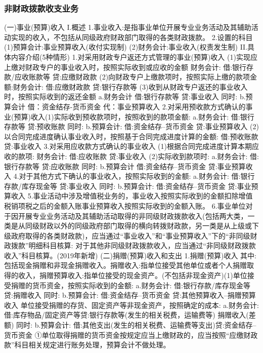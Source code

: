 \documentclass[UTF8,12pt]{ctexart}
\numberwithin{equation}{section} %
\numberwithin{figure}{section}
\numberwithin{table}{section}
\begin{document}
	\subsubsection{非财政拨款收支业务}
	(一)事业(预算)收入
	I.概述
	1.事业收入:是指事业单位开展专业业务活动及其辅助活动实现的收入，不包括从同级政府财政部门取得的各类财政拨款。
	2.设置的科目
	(1)预算会计:事业预算收入(收付实现制)
	(2)财务会计:事业收入(权责发生制)
	II.具体内容介绍(5种情形)
	1.对采用财政专户返还方式管理的事业(预算)收入
	(1)实现应上缴对财政专户的事业收入时，按照实际收到或应收的金额
	财务会计:
	借:银行存款/应收账款等
	贷:应缴财政款
	(2)向财政专户上缴款项时，按照实际上缴的款项金额:财务会计:
	借:应缴财政款
	贷:银行存款等
	(3)收到从财政专户返还的事业收入时，按照实际收到的返还金额
	a.财务会计
	借:银行存款等
	贷:事业收入
	同时:
	b.预算会计
	借：资金结存-货币资金
	代：事业预算收入
	2.对采用预收款方式确认的事业(预算)收入(1)实际收到预收款项时，按照收到的款项金额:
	a.财务会计:
	借:银行存款等
	贷:预收账款
	同时:
	b.预算会计:
	借:资金结存--货币资金
	贷:事业预算收入
	(2)以合同完成进度确认事业收入时，按照基于合同完成进度计算的金额:
	借:预收账款
	贷:事业收入
	3.对采用应收款方式确认的事业收入
	(1)根据合同完成进度计算本期应收的款项:
	财务会计:
	借:应收账款
	贷:事业收入
	(2)实际收到款项时:
	a.财务会计:
	借:银行存款等
	贷:应收账款
	同时:
	b.预算会计
	借:资金结存--货币资金
	贷:事业预算收入
	4.对于其他方式下确认的事业收入，按照实际收到的金额:
	a.财务会计:
	借:银行存款/库存现金等
	贷:事业收入
	同时:
	b.预算会计:
	借:资金结存--货币资金
	贷:事业预算收入
	5.事业活动中涉及增值税业务的，事业收入按照实际收到的金额扣除增值税销项税之后的金额入账事业预算收入按照实际收到的金额入账。
	6.事业单位对于因开展专业业务活动及其辅助活动取得的非同级财政拨款收入(包括两大类，一类是从同级财政以外的同级政府部门取得的横向转拨财政款，另一类是从上级或下级政府取得的各类财政款)，应当通过“事业收入”和“事业预算收入”下的“非同级财政拨款”明细科目核算:
	对于其他非同级财政拨款收入，应当通过“非同级财政拨款收入”科目核算。(2019年新增)
	(二)捐赠(预算)收入和支出
	1.捐赠(预算)收入
	其中:
	包括现金捐赠和非现金捐赠收入。捐赠收入:指单位接受其他单位或者个人捐赠取得的收入，捐赠预算收入:指单位接受的现金资产。(不包括非现金资产)(1)单位接受捐赠的货币资金，按照实际收到的金额:
	a.财务会计:
	借:银行存款/库存现金等
	贷:捐赠收入
	同时:
	b.预算会计:
	借:资金结存--货币资金
	贷:其他预算收入--捐赠预算收入
	单位接受捐赠的存货、固定资产等非现金资产，按照确定的成本:
	a.财务会计:
	借:库存物品/固定资产等贷:银行存款等(发生的相关税费，运输费等)
	捐赠收入(差额)
	同时:
	b.预算会计:
	借:其他支出(发生的相关税费、运输费等支出)贷:资金结存--货币资金
	①单位取得捐赠的货币资金按规定应当上缴财政的，应当按照“应缴财政款”科目相关规定进行账务处理，预算会计不做处理。
\end{document}
